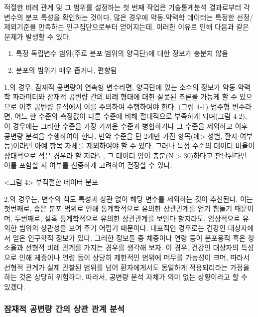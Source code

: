 \documentclass[
  10pt,
]{krantz}
\providecommand{\tightlist}{%
  \setlength{\itemsep}{0pt}\setlength{\parskip}{0pt}}
\begin{document}
적절한 비례 관계 및 그 범위를 설정하는 첫 번째 작업은 기술통계분석 결과로부터 각 변수의 분포 특성을 확인하는 것이다. 많은
경우에 약동-약력학 데이터는 특정한 선정/제외기준을 만족하는 인구집단으로부터 얻어지는데, 이러한 이유로 인해 다음과 같은
문제가 발생할 수 있다.

\begin{enumerate}
\def\labelenumi{\arabic{enumi}.}
\tightlist
\item
  특정 독립변수 범위(주로 분포 범위의 양극단)에 대한 정보가 충분치 않음
\item
  분포의 범위가 매우 좁거나, 편향됨
\end{enumerate}

1.의 경우, 잠재적 공변량이 연속형 변수라면, 양극단에 있는 소수의 정보가 약동-약력학 파라미터와 잠재적 공변량 간의 비례
형태에 대한 잘못된 추론을 가능케 할 수 있으므로 이후 공변량 분석에서 이를 주의하여 수행하여야 한다. (그림 4-1)
범주형 변수라면, 어느 한 수준의 측정값이 다른 수준에 비해 절대적으로 부족하게 되며(그림 4-2), 이 경우에는 그러한 수준을
가장 가까운 수준과 병합하거나 그 수준을 제외하고 이후 공변량 분석을 수행하여야 한다. 만약 수준을 단 2개만 가진
항목(예\textgreater{} 성별, 환자 여부 등)이라면 아예 항목 자체를 제외하여야 할 수 있다. 그러나 특정 수준의 데이터 비율이
상대적으로 적은 경우라 할 지라도, 그 데이터 양이 충분(N \textgreater{} 30)하다고 판단된다면 이를 포함할 지 여부를 신중하게
고려하여 결정할 수 있다.

\textless 그림 4\textgreater{} 부적절한 데이터 분포

2.의 경우는, 변수의 척도 특성과 상관 없이 해당 변수를 제외하는 것이 추천된다. 이는 첫번째로, 좁은 분포 범위로 인해
통계학적으로 유의한 상관관계를 얻기 힘들기 때문이며, 두번째로, 설혹 통계학적으로 유의한 상관관계를 보인다
할지라도, 임상적으로 유의한 범위의 상관성을 보여 주기 어렵기 때문이다. 대표적인 경우로는 건강인 대상자에서 얻은
인구학적 정보가 있다. 그러한 정보들 중 체중이나 연령 등이 분포용적 혹은 청소율과 선형적 비례 관계를 가지는 경우를 생각해
보자. 이 경우, 건강인 대상자의 특성으로 인해 체중이나 연령 등이 상당히 제한적인 범위에 머무를 가능성이 크며, 따라서
선형적 관계가 실제 관찰된 범위를 넘어 환자에게서도 동일하게 적용되리라는 가정을 하는 것은 상당히 위험하다. 따라서,
공변량 분석 자체가 의미 없는 상황이라고 할 수 있겠다.

\hypertarget{uxc7a0uxc7acuxc801-uxacf5uxbcc0uxb7c9-uxac04uxc758-uxc0c1uxad00-uxad00uxacc4-uxbd84uxc11d}{%
\subsubsection{잠재적 공변량 간의 상관 관계 분석}\label{uxc7a0uxc7acuxc801-uxacf5uxbcc0uxb7c9-uxac04uxc758-uxc0c1uxad00-uxad00uxacc4-uxbd84uxc11d}}
\end{document}
